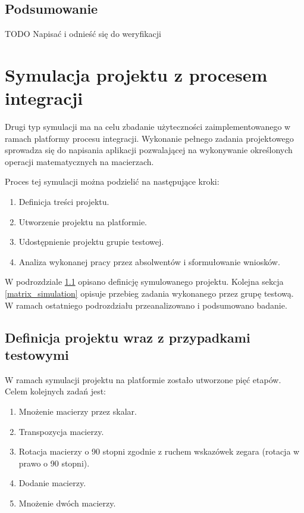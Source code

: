 \subsection{Podsumowanie}

TODO Napisać i odnieść się do weryfikacji


\section{Symulacja projektu z procesem integracji}
\label{research_matrix}

Drugi typ symulacji ma na celu zbadanie użyteczności zaimplementowanego w ramach platformy procesu integracji.
Wykonanie pełnego zadania projektowego sprowadza się do napisania aplikacji pozwalającej na wykonywanie określonych operacji matematycznych na macierzach.

Proces tej symulacji można podzielić na następujące kroki:
\begin{enumerate}
    \item Definicja treści projektu.
    \item Utworzenie projektu na platformie.
    \item Udostępnienie projektu grupie testowej.
    \item Analiza wykonanej pracy przez absolwentów i sformułowanie wniosków.
\end{enumerate}

W podrozdziale \ref{matrix_project_definition} opisano definicję symulowanego projektu.
Kolejna sekcja \ref{matrix_simulation} opisuje przebieg zadania wykonanego przez grupę testową.
W ramach ostatniego podrozdziału przeanalizowano i podsumowano badanie.


\subsection{Definicja projektu wraz z przypadkami testowymi}
\label{matrix_project_definition}

W ramach symulacji projektu na platformie zostało utworzone pięć etapów.
Celem kolejnych zadań jest:
\begin{enumerate}
    \item Mnożenie macierzy przez skalar.
    \item Transpozycja macierzy.
    \item Rotacja macierzy o 90 stopni zgodnie z ruchem wskazówek zegara (rotacja w prawo o 90 stopni).
    \item Dodanie macierzy.
    \item Mnożenie dwóch macierzy.
\end{enumerate}

